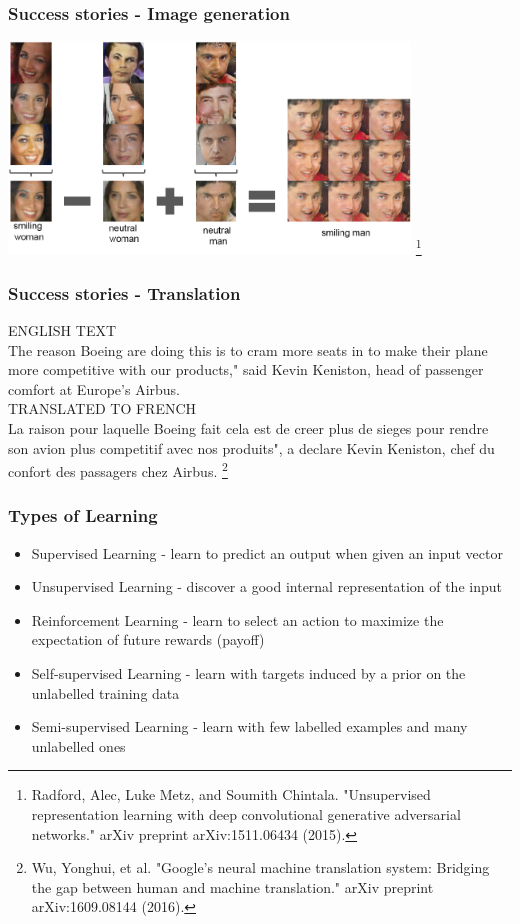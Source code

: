\documentclass[\beamerclass]{beamer}
\newcommand\blfootnote[1]{%
  \begingroup
  \renewcommand\thefootnote{}\footnote{#1}%
  \addtocounter{footnote}{-1}%
  \endgroup
}
\begin{document}
\begin{frame}
	\frametitle{Success stories - Image generation}
	\centering \includegraphics[width=0.8\textwidth]{imggen.pdf}\blfootnote{Radford, Alec, Luke Metz, and Soumith Chintala. "Unsupervised representation learning with deep convolutional generative adversarial networks." arXiv preprint arXiv:1511.06434 (2015).}
\end{frame}

\begin{frame}
	\frametitle{Success stories - Translation}

ENGLISH TEXT\\
The reason Boeing are doing this is to cram more seats in to make their plane
more competitive with our products," said Kevin Keniston, head of passenger
comfort at Europe's Airbus.
\\[1em]
TRANSLATED TO FRENCH\\
La raison pour laquelle Boeing fait cela est de creer plus de sieges pour rendre
son avion plus competitif avec nos produits", a declare Kevin Keniston, chef
du confort des passagers chez Airbus. \blfootnote{Wu, Yonghui, et al. "Google's neural machine translation system: Bridging the gap between human and machine translation." arXiv preprint arXiv:1609.08144 (2016).}

\end{frame}

\begin{frame}[fragile]\frametitle{Types of Learning}
\begin{itemize}
\item Supervised Learning - learn to predict an output when given an input vector

\item Unsupervised Learning - discover a good internal representation of the input

\item Reinforcement Learning - learn to select an action to maximize the expectation of future rewards (payoff)

\item Self-supervised Learning - learn with targets induced by a prior on the unlabelled training data

\item Semi-supervised Learning - learn with few labelled examples and many unlabelled ones
\end{itemize}

\end{frame}
\end{document}
